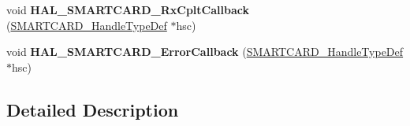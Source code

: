 \begin{DoxyCompactItemize}
\item 
void {\bfseries H\+A\+L\+\_\+\+S\+M\+A\+R\+T\+C\+A\+R\+D\+\_\+\+Rx\+Cplt\+Callback} (\hyperlink{struct_s_m_a_r_t_c_a_r_d___handle_type_def}{S\+M\+A\+R\+T\+C\+A\+R\+D\+\_\+\+Handle\+Type\+Def} $\ast$hsc)\hypertarget{group___s_m_a_r_t_c_a_r_d___exported___functions___group2_ga955fe3e5402e8a2797af8b605701dde4}{}\label{group___s_m_a_r_t_c_a_r_d___exported___functions___group2_ga955fe3e5402e8a2797af8b605701dde4}

\item 
void {\bfseries H\+A\+L\+\_\+\+S\+M\+A\+R\+T\+C\+A\+R\+D\+\_\+\+Error\+Callback} (\hyperlink{struct_s_m_a_r_t_c_a_r_d___handle_type_def}{S\+M\+A\+R\+T\+C\+A\+R\+D\+\_\+\+Handle\+Type\+Def} $\ast$hsc)\hypertarget{group___s_m_a_r_t_c_a_r_d___exported___functions___group2_ga6a5255ea10c1c5c0d3b037ce61d5dc91}{}\label{group___s_m_a_r_t_c_a_r_d___exported___functions___group2_ga6a5255ea10c1c5c0d3b037ce61d5dc91}

\end{DoxyCompactItemize}


\subsection{Detailed Description}
